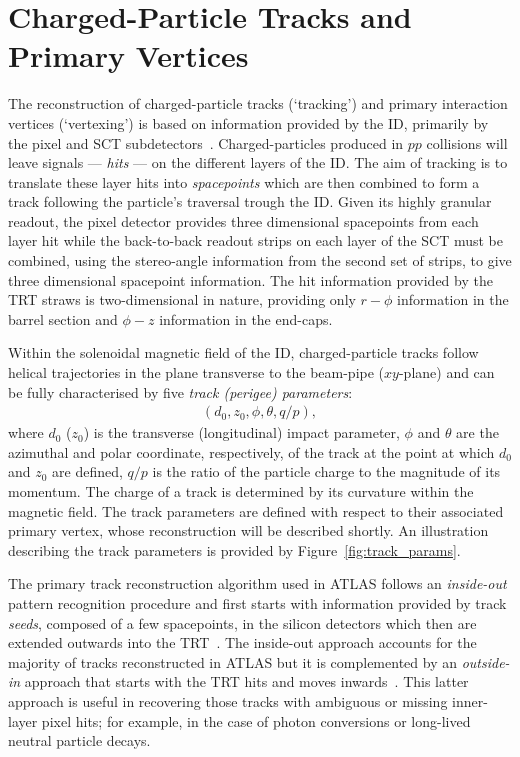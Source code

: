\section{Charged-Particle Tracks and Primary Vertices}
\label{sec:tracks_and_vertices}

The reconstruction of charged-particle tracks (`tracking') and primary interaction
vertices (`vertexing') is based on information provided by the ID, primarily by
the pixel and SCT subdetectors~\cite{NEWTracking,TIDE,Aaboud:2016rmg,ATLAS-CONF-2010-069,Piacquadio_2008}.
Charged-particles produced in $pp$ collisions will leave signals --- \textit{hits} ---
on the different layers of the ID.
The aim of tracking is to translate these layer hits into \textit{spacepoints}
which are then combined to form a track following the particle's traversal trough the ID.
Given its highly granular readout, the pixel detector provides three dimensional spacepoints
from each layer hit while the back-to-back readout strips on each layer of the SCT 
must be combined, using the stereo-angle information from the second set of strips, to
give three dimensional spacepoint information.
The hit information provided by the TRT straws is two-dimensional in nature, providing only
$r-\phi$ information in the barrel section and $\phi-z$ information in the end-caps.

Within the solenoidal magnetic field of the ID, charged-particle tracks follow
helical trajectories in the plane transverse to the beam-pipe ($xy$-plane) and
can be fully characterised by five \textit{track (perigee) parameters}:
\begin{align}
    \left(d_0, z_0, \phi, \theta, q/p\right),
    \label{eq:track_parameters}
\end{align}
where $d_0$ ($z_0$) is the transverse (longitudinal) impact parameter,
$\phi$ and $\theta$ are the azimuthal and polar coordinate, respectively, of the track at the
point at which $d_0$ and $z_0$ are defined, $q/p$ is the ratio of the particle charge
to the magnitude of its momentum.
The charge of a track is determined by its curvature within the magnetic field.
The track parameters are defined with respect to their associated primary
vertex, whose reconstruction will be described shortly.
An illustration describing the track parameters is provided by Figure~\ref{fig:track_params}.

The primary track reconstruction algorithm used in ATLAS follows an \textit{inside-out} pattern
recognition procedure and first starts with information
provided by track \textit{seeds}, composed of a few spacepoints, in the silicon detectors
which then are extended outwards into the TRT~\cite{NEWTracking}.
The inside-out approach accounts for the majority of tracks reconstructed in ATLAS but
it is complemented by an \textit{outside-in} approach that starts with the TRT hits and moves
inwards~\cite{NEWTracking}.
This latter approach is useful in recovering those tracks with ambiguous or missing inner-layer pixel hits;
for example, in the case of photon
conversions or long-lived neutral particle decays.

